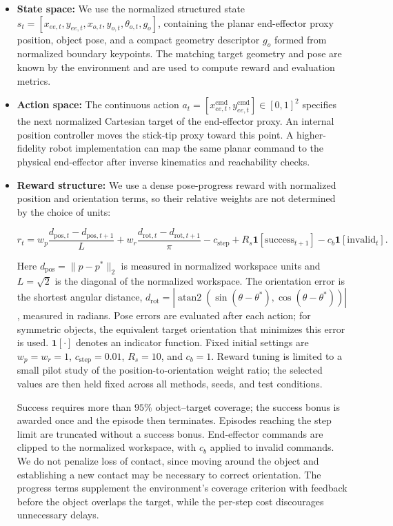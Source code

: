 \documentclass[11pt,onecolumn]{IEEEtran}
\begin{document}
\begin{itemize}

    \item
    \textbf{State space:}
    We use the normalized structured state
    $s_t=[x_{ee,t},y_{ee,t},x_{o,t},y_{o,t},\theta_{o,t},g_o]$, containing the
    planar end-effector proxy position, object pose, and a compact geometry
    descriptor $g_o$ formed from normalized boundary keypoints. The matching
    target geometry and pose are known by the environment and are used to
    compute reward and evaluation metrics.

    \item
    \textbf{Action space:}
    The continuous action
    $a_t=[x^{\mathrm{cmd}}_{ee,t},y^{\mathrm{cmd}}_{ee,t}]\in[0,1]^2$
    specifies the next normalized Cartesian target of the end-effector proxy.
    An internal position controller moves the stick-tip proxy toward this point.
    A higher-fidelity robot implementation can map the same planar command to
    the physical end-effector after inverse kinematics and reachability checks.

    \item
    \textbf{Reward structure:}
    We use a dense pose-progress reward with normalized position and orientation
    terms, so their relative weights are not determined by the choice of units:

    \[
        r_t =
        w_p \frac{d_{\mathrm{pos},t}-d_{\mathrm{pos},t+1}}{L}
        +w_r \frac{d_{\mathrm{rot},t}-d_{\mathrm{rot},t+1}}{\pi}
        - c_{\mathrm{step}}
        + R_s\mathbf{1}[\mathrm{success}_{t+1}]
        - c_b\mathbf{1}[\mathrm{invalid}_t].
    \]

    Here $d_{\mathrm{pos}}=\|p-p^*\|_2$ is measured in normalized workspace
    units and $L=\sqrt{2}$ is the diagonal of the normalized workspace. The
    orientation error is the shortest angular distance,
    $d_{\mathrm{rot}}=|\operatorname{atan2}(\sin(\theta-\theta^*),
    \cos(\theta-\theta^*))|$, measured in radians. Pose errors are evaluated
    after each action; for symmetric objects, the equivalent target orientation
    that minimizes this error is used. $\mathbf{1}[\cdot]$ denotes an indicator
    function. Fixed initial settings are $w_p=w_r=1$,
    $c_{\mathrm{step}}=0.01$, $R_s=10$, and $c_b=1$. Reward tuning is limited
    to a small pilot study of the position-to-orientation weight ratio; the
    selected values are then held fixed across all methods, seeds, and test
    conditions.

    Success requires more than $95\%$ object--target coverage; the success bonus
    is awarded once and the episode then terminates. Episodes reaching the step
    limit are truncated without a success bonus. End-effector commands are
    clipped to the normalized workspace, with $c_b$ applied to invalid
    commands. We do not penalize loss of contact, since moving around the object
    and establishing a new contact may be necessary to correct orientation. The
    progress terms supplement the environment's coverage criterion with
    feedback before the object overlaps the target, while the per-step cost
    discourages unnecessary delays.


\end{itemize}
\end{document}
